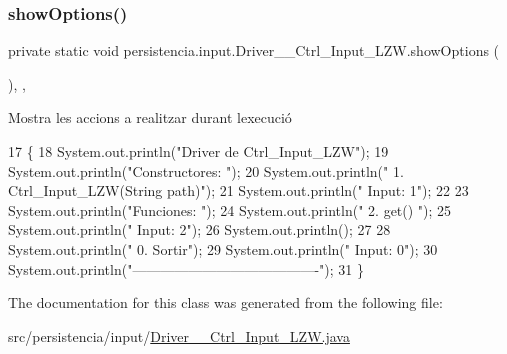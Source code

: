\subsubsection{\texorpdfstring{show\+Options()}{showOptions()}}
{\footnotesize\ttfamily private static void persistencia.\+input.\+Driver\+\_\+\+\_\+\+Ctrl\+\_\+\+Input\+\_\+\+L\+Z\+W.\+show\+Options (\begin{DoxyParamCaption}{ }\end{DoxyParamCaption})\hspace{0.3cm}{\ttfamily [inline]}, {\ttfamily [static]}, {\ttfamily [private]}}



Mostra les accions a realitzar durant l\textquotesingle{}execució 


\begin{DoxyCode}
17                                      \{
18         System.out.println(\textcolor{stringliteral}{"Driver de Ctrl\_Input\_LZW"});
19         System.out.println(\textcolor{stringliteral}{"Constructores: "});
20         System.out.println(\textcolor{stringliteral}{"     1. Ctrl\_Input\_LZW(String path)"});
21         System.out.println(\textcolor{stringliteral}{"     Input: 1"});
22 
23         System.out.println(\textcolor{stringliteral}{"Funciones: "});
24         System.out.println(\textcolor{stringliteral}{"     2. get() "});
25         System.out.println(\textcolor{stringliteral}{"     Input: 2"});
26         System.out.println();
27 
28         System.out.println(\textcolor{stringliteral}{"     0. Sortir"});
29         System.out.println(\textcolor{stringliteral}{"     Input: 0"});
30         System.out.println(\textcolor{stringliteral}{"----------------------------------------"});
31     \}
\end{DoxyCode}


The documentation for this class was generated from the following file\+:\begin{DoxyCompactItemize}
\item 
src/persistencia/input/\hyperlink{Driver____Ctrl__Input__LZW_8java}{Driver\+\_\+\+\_\+\+Ctrl\+\_\+\+Input\+\_\+\+L\+Z\+W.\+java}\end{DoxyCompactItemize}
